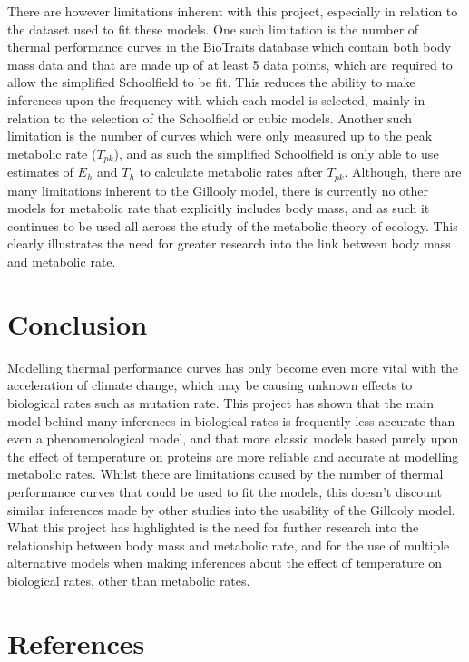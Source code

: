 \documentclass[11pt]{article}
\begin{document}
\begin{linenumbers}
There are however limitations inherent with this project, especially in relation to the dataset used to fit these models. One such limitation is the number of thermal performance curves in the BioTraits database which contain both body mass data and that are made up of at least 5 data points, which are required to allow the simplified Schoolfield to be fit. This reduces the ability to make inferences upon the frequency with which each model is selected, mainly in relation to the selection of the Schoolfield or cubic models. Another such limitation is the number of curves which were only measured up to the peak metabolic rate ($T_{pk}$), and as such the simplified Schoolfield is only able to use estimates of $E_{h}$ and $T_{h}$ to calculate metabolic rates after $T_{pk}$. Although, there are many limitations inherent to the Gillooly model, there is currently no other models for metabolic rate that explicitly includes body mass, and as such it continues to be used all across the study of the metabolic theory of ecology. This clearly illustrates the need for greater research into the link between body mass and metabolic rate.

\section{Conclusion}
Modelling thermal performance curves has only become even more vital with the acceleration of climate change, which may be causing unknown effects to biological rates such as mutation rate. This project has shown that the main model behind many inferences in biological rates is frequently less accurate than even a phenomenological model, and that more classic models based purely upon the effect of temperature on proteins are more reliable and accurate at modelling metabolic rates. Whilst there are limitations caused by the number of thermal performance curves that could be used to fit the models, this doesn't discount similar inferences made by other studies into the usability of the Gillooly model. What this project has highlighted is the need for further research into the relationship between body mass and metabolic rate, and for the use of multiple alternative models when making inferences about the effect of temperature on biological rates, other than metabolic rates.

\section{References}


\end{linenumbers}
\end{document}
